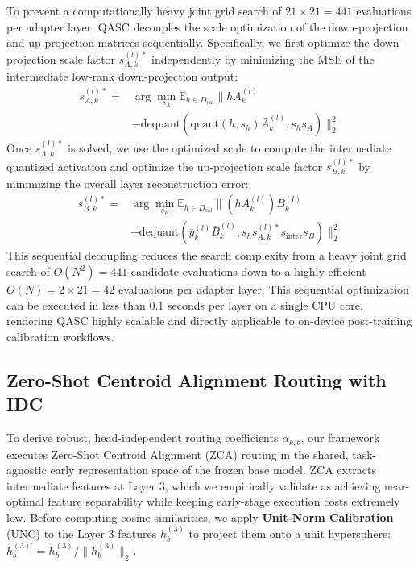 To prevent a computationally heavy joint grid search of $21 \times 21 = 441$ evaluations per adapter layer, QASC decouples the scale optimization of the down-projection and up-projection matrices sequentially. Specifically, we first optimize the down-projection scale factor $s_{A, k}^{(l)*}$ independently by minimizing the MSE of the intermediate low-rank down-projection output:
\begin{equation}
  \begin{split}
    s_{A, k}^{(l)*} = & \arg\min_{s_A} \mathbb{E}_{h \in D_{\text{cal}}} \Big\| h A_k^{(l)} \\
    & - \text{dequant}\left( \text{quant}(h, s_h) \bar{A}_k^{(l)}, s_h s_A \right) \Big\|_2^2
  \end{split}
\end{equation}
Once $s_{A, k}^{(l)*}$ is solved, we use the optimized scale to compute the intermediate quantized activation and optimize the up-projection scale factor $s_{B, k}^{(l)*}$ by minimizing the overall layer reconstruction error:
\begin{equation}
  \begin{split}
    s_{B, k}^{(l)*} = & \arg\min_{s_B} \mathbb{E}_{h \in D_{\text{cal}}} \Big\| \left( h A_k^{(l)} \right) B_k^{(l)} \\
    & - \text{dequant}\left( \bar{y}_k^{(l)} \bar{B}_k^{(l)}, s_h s_{A, k}^{(l)*} s_{\text{inter}} s_B \right) \Big\|_2^2
  \end{split}
\end{equation}
This sequential decoupling reduces the search complexity from a heavy joint grid search of $O(N^2) = 441$ candidate evaluations down to a highly efficient $O(N) = 2 \times 21 = 42$ evaluations per adapter layer. This sequential optimization can be executed in less than 0.1 seconds per layer on a single CPU core, rendering QASC highly scalable and directly applicable to on-device post-training calibration workflows.

\subsection{Zero-Shot Centroid Alignment Routing with IDC}
To derive robust, head-independent routing coefficients $\alpha_{k, b}$, our framework executes Zero-Shot Centroid Alignment (ZCA) routing in the shared, task-agnostic early representation space of the frozen base model. ZCA extracts intermediate features at Layer 3, which we empirically validate as achieving near-optimal feature separability while keeping early-stage execution costs extremely low. Before computing cosine similarities, we apply \textbf{Unit-Norm Calibration} (UNC) to the Layer 3 features $h_b^{(3)}$ to project them onto a unit hypersphere: $h_b^{(3)\prime} = h_b^{(3)} / \|h_b^{(3)}\|_2$. 

